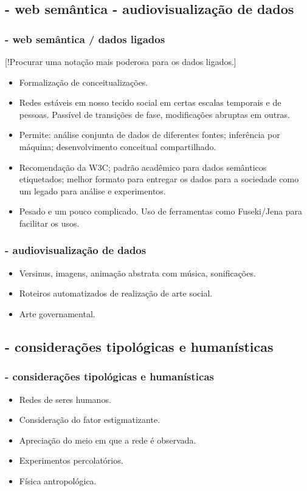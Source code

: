 \documentclass[10pt]{beamer}
\begin{document}
\begin{frame}
\subsection{- web semântica \;\; - audiovisualização de dados}
\frametitle{- web semântica / dados ligados}
[!Procurar uma notação mais poderosa para os dados ligados.]
\begin{itemize}
	\item Formalização de conceitualizações.
	\item Redes estáveis em nosso tecido social em certas escalas temporais e de pessoas.
		Passível de transições de fase, modificações abruptas em outras.
	\item Permite: análise conjunta de dados de diferentes fontes; inferência por máquina; desenvolvimento conceitual compartilhado.
	\item Recomendação da W3C; padrão acadêmico para dados semânticos etiquetados; melhor formato para entregar os dados para a sociedade como um legado para análise e experimentos.
	\item Pesado e um pouco complicado. Uso de ferramentas como Fuseki/Jena para facilitar os usos.
\end{itemize}

\end{frame}
\begin{frame}
\frametitle{- audiovisualização de dados}
\begin{itemize}
	\item Versinus, imagens, animação abstrata com música, sonificações.
	\item Roteiros automatizados de realização de arte social.
	\item Arte governamental.
\end{itemize}
\end{frame}

\begin{frame}
\subsection{- considerações tipológicas e humanísticas}
\frametitle{- considerações tipológicas e humanísticas}
\begin{itemize}
	\item Redes de seres humanos.
	\item Consideração do fator estigmatizante.
	\item Apreciação do meio em que a rede é observada.
	\item Experimentos percolatórios.
	\item Física antropológica.
\end{itemize}
\end{frame}
\end{document}
